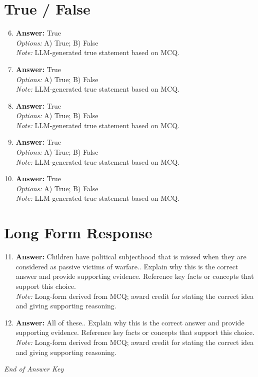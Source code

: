 \documentclass[12pt]{article}
\begin{document}
\section*{True / False}
\begin{enumerate}[label=\arabic*.]
\setcounter{enumi}{5}
\item \textbf{Answer:} True
\\ \textit{Options:} A) True; B) False
\\ \textit{Note:} LLM-generated true statement based on MCQ.
\item \textbf{Answer:} True
\\ \textit{Options:} A) True; B) False
\\ \textit{Note:} LLM-generated true statement based on MCQ.
\item \textbf{Answer:} True
\\ \textit{Options:} A) True; B) False
\\ \textit{Note:} LLM-generated true statement based on MCQ.
\item \textbf{Answer:} True
\\ \textit{Options:} A) True; B) False
\\ \textit{Note:} LLM-generated true statement based on MCQ.
\item \textbf{Answer:} True
\\ \textit{Options:} A) True; B) False
\\ \textit{Note:} LLM-generated true statement based on MCQ.
\end{enumerate}

\section*{Long Form Response}
\begin{enumerate}[label=\arabic*.]
\setcounter{enumi}{10}
\item \textbf{Answer:} Children have political subjecthood that is missed when they are considered as passive victims of warfare.. Explain why this is the correct answer and provide supporting evidence. Reference key facts or concepts that support this choice.
\\ \textit{Note:} Long-form derived from MCQ; award credit for stating the correct idea and giving supporting reasoning.
\item \textbf{Answer:} All of these.. Explain why this is the correct answer and provide supporting evidence. Reference key facts or concepts that support this choice.
\\ \textit{Note:} Long-form derived from MCQ; award credit for stating the correct idea and giving supporting reasoning.
\end{enumerate}

\vfill
\noindent\textit{End of Answer Key}
\end{document}
